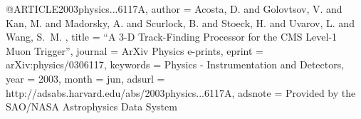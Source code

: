 @ARTICLE{2003physics...6117A,
   author = {{Acosta}, D. and {Golovtsov}, V. and {Kan}, M. and {Madorsky}, A. and 
     {Scurlock}, B. and {Stoeck}, H. and {Uvarov}, L. and {Wang}, S.~M.
     },
    title = ``{A 3-D Track-Finding Processor for the CMS Level-1 Muon Trigger}'',
  journal = {ArXiv Physics e-prints},
   eprint = {arXiv:physics/0306117},
 keywords = {Physics - Instrumentation and Detectors},
     year = 2003,
    month = jun,
   adsurl = {http://adsabs.harvard.edu/abs/2003physics...6117A},
  adsnote = {Provided by the SAO/NASA Astrophysics Data System}
}